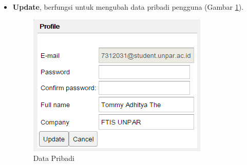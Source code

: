 \begin{enumerate}
\begin{itemize}
		\item \textbf{Update}, berfungsi untuk mengubah data pribadi pengguna (Gambar \ref{fig:3_tampilan_profil}).\\
		\begin{figure}[htbp]
			\centering
				\includegraphics[scale=0.7]{Gambar/3_tampilan_profil.PNG}
			\caption{Data Pribadi}
			\label{fig:3_tampilan_profil}
		\end{figure}
	\end{itemize}
	

\end{enumerate}
